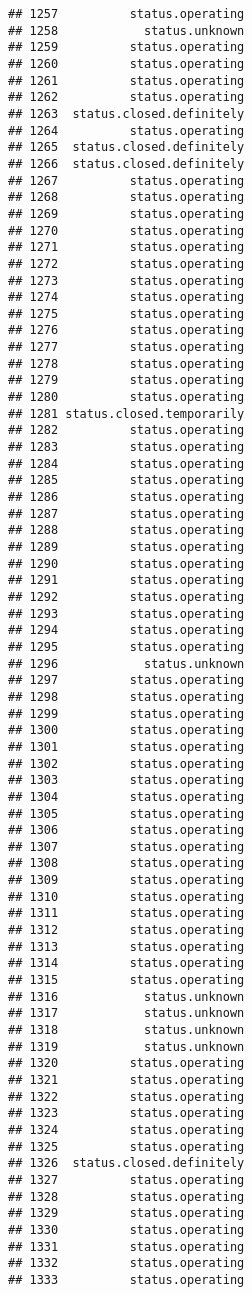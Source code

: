 \documentclass[
]{article}
\begin{document}
\begin{verbatim}
## 1257          status.operating
## 1258            status.unknown
## 1259          status.operating
## 1260          status.operating
## 1261          status.operating
## 1262          status.operating
## 1263  status.closed.definitely
## 1264          status.operating
## 1265  status.closed.definitely
## 1266  status.closed.definitely
## 1267          status.operating
## 1268          status.operating
## 1269          status.operating
## 1270          status.operating
## 1271          status.operating
## 1272          status.operating
## 1273          status.operating
## 1274          status.operating
## 1275          status.operating
## 1276          status.operating
## 1277          status.operating
## 1278          status.operating
## 1279          status.operating
## 1280          status.operating
## 1281 status.closed.temporarily
## 1282          status.operating
## 1283          status.operating
## 1284          status.operating
## 1285          status.operating
## 1286          status.operating
## 1287          status.operating
## 1288          status.operating
## 1289          status.operating
## 1290          status.operating
## 1291          status.operating
## 1292          status.operating
## 1293          status.operating
## 1294          status.operating
## 1295          status.operating
## 1296            status.unknown
## 1297          status.operating
## 1298          status.operating
## 1299          status.operating
## 1300          status.operating
## 1301          status.operating
## 1302          status.operating
## 1303          status.operating
## 1304          status.operating
## 1305          status.operating
## 1306          status.operating
## 1307          status.operating
## 1308          status.operating
## 1309          status.operating
## 1310          status.operating
## 1311          status.operating
## 1312          status.operating
## 1313          status.operating
## 1314          status.operating
## 1315          status.operating
## 1316            status.unknown
## 1317            status.unknown
## 1318            status.unknown
## 1319            status.unknown
## 1320          status.operating
## 1321          status.operating
## 1322          status.operating
## 1323          status.operating
## 1324          status.operating
## 1325          status.operating
## 1326  status.closed.definitely
## 1327          status.operating
## 1328          status.operating
## 1329          status.operating
## 1330          status.operating
## 1331          status.operating
## 1332          status.operating
## 1333          status.operating

\end{verbatim}
\end{document}

